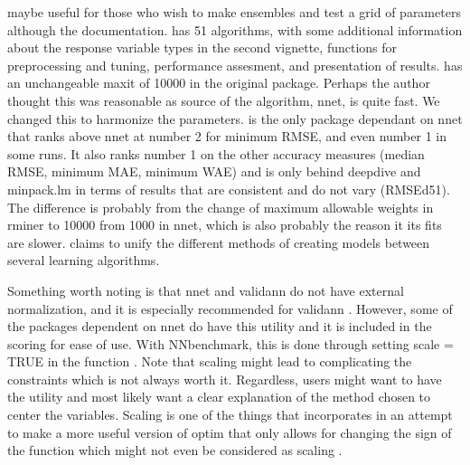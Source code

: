  \citep{R-EnsembleBase} maybe useful for those who
wish to make ensembles and test a grid of parameters although the
documentation.  \citep{R-MachineShop} has 51
algorithms, with some additional information about the response variable
types in the second vignette, functions for preprocessing and tuning,
performance assesment, and presentation of results.
 \citep{R-radiant.model} has an unchangeable
maxit of 10000 in the original package. Perhaps the author thought this
was reasonable as source of the algorithm, nnet, is quite fast. We
changed this to harmonize the parameters. 
\citep{R-rminer} is the only package dependant on nnet that ranks above
nnet at number 2 for minimum RMSE, and even number 1 in some runs. It
also ranks number 1 on the other accuracy measures (median RMSE, minimum
MAE, minimum WAE) and is only behind deepdive and minpack.lm in terms of
results that are consistent and do not vary (RMSEd51). The difference is
probably from the change of maximum allowable weights in rminer to 10000
from 1000 in nnet, which is also probably the reason it its fits are
slower.  \citep{R-traineR} claims to unify the
different methods of creating models between several learning
algorithms.

Something worth noting is that nnet and validann do not have external
normalization, and it is especially recommended for validann . However,
some of the packages dependent on nnet do have this utility and it is
included in the scoring for ease of use. With NNbenchmark, this is done
through setting scale = TRUE in the function . Note
that scaling might lead to complicating the constraints which is not
always worth it. Regardless, users might want to have the utility and
most likely want a clear explanation of the method chosen to center the
variables. Scaling is one of the things that 
\citep{R-optimx} incorporates in an attempt to make a more useful
version of optim that only allows for changing the sign of the function
which might not even be considered as scaling \citep{Nash-nlpor14}.

